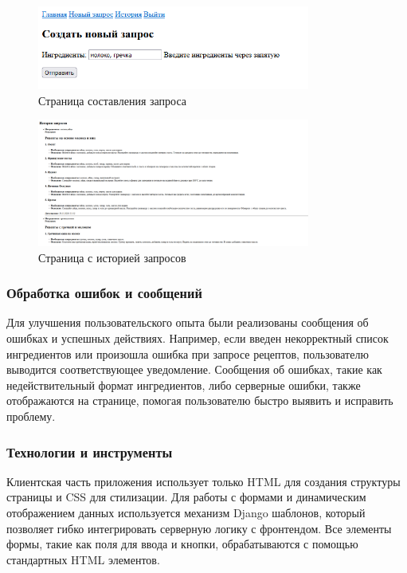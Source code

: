 {{\begin{figure}[H]
        \centering
        \includegraphics[width=0.8\textwidth]{assets/request.png} 
        \caption{Страница составления запроса}
    \end{figure}
    \begin{figure}[H]
        \centering
        \includegraphics[width=0.8\textwidth]{assets/requests_history.png} 
        \caption{Страница с историей запросов}
    \end{figure}
    
    \subsubsection*{Обработка ошибок и сообщений}
    
    Для улучшения пользовательского опыта были реализованы сообщения об ошибках и успешных действиях. Например, если введен некорректный список ингредиентов или произошла ошибка при запросе рецептов, пользователю выводится соответствующее уведомление. Сообщения об ошибках, такие как недействительный формат ингредиентов, либо серверные ошибки, также отображаются на странице, помогая пользователю быстро выявить и исправить проблему.
    
    \subsubsection*{Технологии и инструменты}
    
    Клиентская часть приложения использует только HTML для создания структуры страницы и CSS для стилизации. Для работы с формами и динамическим отображением данных используется механизм Django шаблонов, который позволяет гибко интегрировать серверную логику с фронтендом. Все элементы формы, такие как поля для ввода и кнопки, обрабатываются с помощью стандартных HTML элементов.
    
}}
